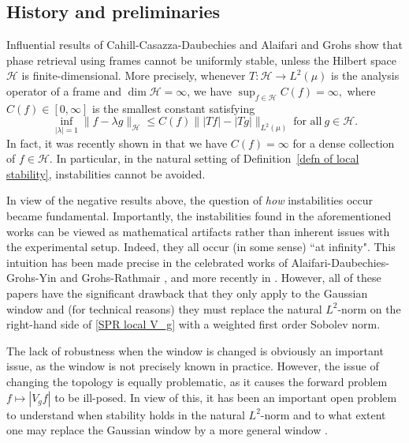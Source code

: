 \documentclass[11pt]{amsart}
\theoremstyle{remark}
\begin{document}
\subsection{History and preliminaries} Influential results of Cahill-Casazza-Daubechies \cite{MR3554699} and Alaifari and Grohs \cite{MR3656501} show that phase retrieval using frames  cannot be uniformly stable, unless the Hilbert space $\mathcal{H}$ is finite-dimensional. More precisely,  whenever $T:\mathcal{H} \to L^2(\mu)$ is the analysis operator of a frame and $\dim\mathcal{H}=\infty$, we have $\sup_{f\in \mathcal{H}}C(f)=\infty,$ where $C(f)\in [0,\infty]$ is the smallest constant satisfying
\begin{equation*}\label{LSPR intro}
    \inf_{|\lambda|=1}\|f-\lambda g\|_{\mathcal{H}}\leq C(f)\| |Tf|-|Tg|\|_{L^2(\mu)} \ \text{for all} \ g\in \mathcal{H}.
\end{equation*} 
 In fact, it was recently shown in \cite{Alharbi2024Locality} that we have $C(f)=\infty$ for a dense collection of $f\in \mathcal{H}$. In particular, in the natural setting of Definition~\ref{defn of local stability}, instabilities cannot be avoided. 
 \medskip

 In view of the negative results above, the question of \emph{how} instabilities occur became fundamental. Importantly, the instabilities found in the aforementioned works can be viewed as mathematical artifacts rather than inherent issues with the experimental setup. Indeed, they all occur (in some sense) ``at infinity". This intuition has been made precise in the celebrated works of Alaifari-Daubechies-Grohs-Yin \cite{alaifari2019Stable} and Grohs-Rathmair \cite{Grohs2019Stable,MR4404785}, and more recently in \cite{alaifari2025cheeger}. However, all of these papers have the significant drawback that they only apply to the Gaussian window and (for technical reasons) they must replace the natural $L^2$-norm on the right-hand side of \eqref{SPR local V_g} with a weighted first order Sobolev norm.
 \medskip
 
 The lack of robustness when the window is changed is obviously an important issue, as the window is not precisely known in practice. However, the issue of changing the topology is equally problematic, as it causes the forward problem $f\mapsto |V_gf|$ to be ill-posed. In view of this, it has been an important open problem to understand when stability holds in the natural $L^2$-norm and to what extent one may replace the Gaussian window by a more general window \cite{rathmair2024stable}.
\end{document}
